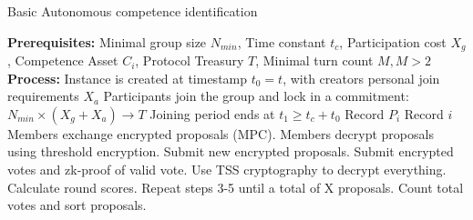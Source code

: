 
\begin{algorithm}
\caption{Basic Autonomous competence identification}
\begin{algorithmic}[1] %
\State \textbf{Prerequisites:} Minimal group size $N_{min}$, Time constant $t_{c}$, Participation cost $X_g$, Competence Asset $C_i$, Protocol Treasury $T$, Minimal turn count ${M, M > 2}$
\State \textbf{Process:}
    \State Instance is created at timestamp $t_0=t$, with creators personal join requirements $X_a$
    \State Participants join the group and lock in a commitment: $N_{min} \times (X_g+X_a) \rightarrow T$
    \State Joining period ends at $t_1  \ge t_c + t_0$
\EndProcedure
{}
        \State Record ${P_i}$
        \State Record $i$
        \EndIf
    \EndWhile
        \State Members exchange encrypted proposals (MPC).
    \EndIf
\EndProcedure
{}
        \State Members decrypt proposals using threshold encryption.
    \EndIf
\EndProcedure
{}
    \State Submit new encrypted proposals.
    \State Submit encrypted votes and zk-proof of valid vote.
\EndProcedure
{}
        \State Use TSS cryptography to decrypt everything.
        \State Calculate round scores.
    \EndIf
\EndProcedure
{}
    \State Repeat steps 3-5 until a total of X proposals.
\EndProcedure
{}
    \State Count total votes and sort proposals.
\EndProcedure
\end{algorithmic}
\end{algorithm}

